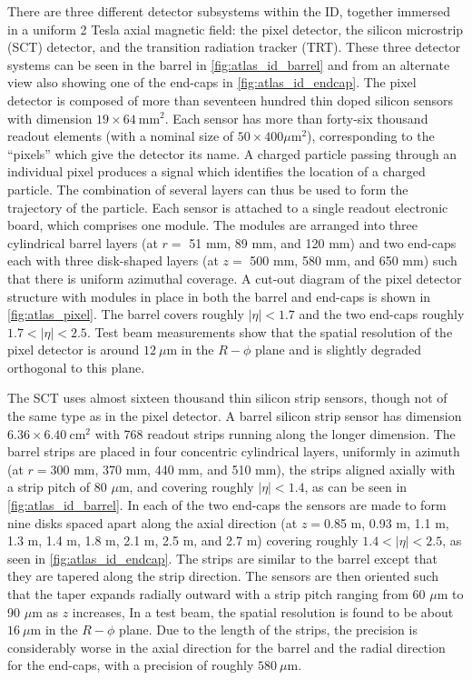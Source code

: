 There are three different detector subsystems within the ID, together
immersed in a uniform 2 Tesla axial magnetic field: the pixel detector,
the silicon microstrip (SCT) detector, and the transition radiation
tracker (TRT). These three detector systems can be seen 
in the barrel in \fig\ref{fig:atlas_id_barrel} and from an alternate
view also showing one of the end-caps in \fig\ref{fig:atlas_id_endcap}. 
The pixel detector
is composed of more than seventeen hundred thin doped silicon sensors with 
dimension $19\times 64~\textrm{mm}^2$. Each sensor has more than forty-six
thousand readout elements (with a 
nominal size of $50 \times 400 \mu\textrm{m}^2$),
corresponding to the ``pixels'' which give the detector its name. 
A charged particle passing through an individual pixel produces a signal
which identifies the location of a charged particle. The combination of 
several layers can thus be used to form the trajectory of the particle. %
Each sensor is attached to a single readout electronic board, which comprises
one module.
The modules are arranged into three cylindrical barrel layers (at 
$r = $ 51 mm, 89 mm, and 120 mm)  and 
two end-caps each with three disk-shaped layers (at $z = $ 500 mm, 580 mm, 
and 650 mm) such that there is uniform
azimuthal coverage. A cut-out diagram of the pixel detector 
structure with modules in place in both the barrel and end-caps is shown 
in \fig\ref{fig:atlas_pixel}. The barrel covers roughly 
$|\eta|<1.7$ and the two end-caps roughly $1.7<|\eta|<2.5$.
Test beam measurements show that the 
spatial resolution of the pixel detector is around $12~\mu\textrm{m}$ in 
the $R-\phi$ plane and is slightly degraded orthogonal to this plane.



The SCT uses almost sixteen thousand thin silicon strip sensors, though not of the 
same type as in the pixel detector. 
A barrel silicon strip sensor has dimension $6.36\times 6.40~\textrm{cm}^2$
with 768 readout strips running along the longer dimension. The barrel
strips are placed in four concentric cylindrical layers, uniformly in azimuth
(at $r = $300 mm, 370 mm, 440 mm, and 510 mm),
the strips aligned axially with a strip pitch of 
80 $\mu$m, and covering roughly
$|\eta|<1.4$, as can be seen in \fig\ref{fig:atlas_id_barrel}.
In each of the two end-caps the sensors are made to form nine
disks spaced apart along the axial 
direction (at $z = $0.85 m, 0.93 m, 1.1 m, 1.3 m, 1.4 m, 
1.8 m, 2.1 m, 2.5 m, and 2.7 m) covering roughly $1.4 < |\eta|<2.5$, 
as seen in \fig\ref{fig:atlas_id_endcap}. The strips are similar
to the barrel except that they are tapered along the strip direction.
The sensors are then oriented such that the taper expands radially outward
with a strip pitch ranging from 60 $\mu$m to 90 $\mu$m as $z$ increases, 
In a test beam, the spatial resolution is found to be about $16~\mu\textrm{m}$
in the $R-\phi$ plane. Due to the length of the strips, the precision is considerably
worse in the axial direction for the barrel and the radial direction for 
the end-caps, with a precision of roughly $580~\mu\textrm{m}$.


